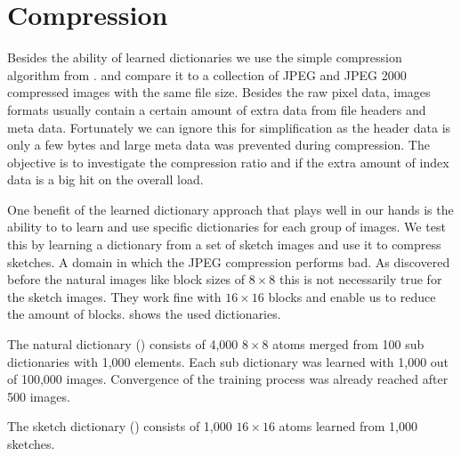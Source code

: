 \clearpage
\section{Compression}
Besides the ability of learned dictionaries 
we use the simple compression algorithm from .
and compare it to a collection of JPEG and JPEG 2000 compressed images with the
same file size. Besides the raw pixel data, images formats usually contain a
certain amount of extra data from file headers and meta data. Fortunately we can
ignore this for simplification as the header data is only a few bytes and
large meta data was prevented during compression. 
The objective is to investigate the compression ratio and if the extra amount of
index data is a big hit on the overall load.

One benefit of the learned dictionary approach that plays well in our
hands is the ability to to learn and use specific dictionaries for each group of
images. We test this by learning a dictionary from a set of sketch images and
use it to compress sketches. A domain in which the JPEG compression performs
bad. As discovered before the natural images like block sizes of $8\times 8$
this is not necessarily true for the sketch images. They work fine with
$16\times 16$ blocks and enable us to reduce the amount of blocks.
 shows the used dictionaries. 

The natural dictionary () consists of 4,000 $8 \times
8$ atoms merged from 100 sub dictionaries with 1,000 elements. Each sub
dictionary was learned with 1,000 out of 100,000 images. Convergence of the
training process was already reached after 500 images.

The sketch dictionary () consists of 1,000
$16\times 16$ atoms learned from 1,000 sketches.

